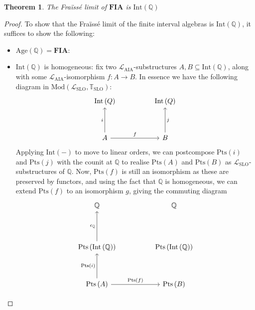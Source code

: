 \documentclass[11pt %
              ]{article}
\newcommand{\Q}{\mathbb{Q}}
\newcommand{\counit}[1]{\epsilon_{#1}}
\newcommand{\lang}{\mathcal{L}}
\newcommand{\theory}{\mathbb{T}}
\newcommand{\age}[1]{\text{Age}\left(#1\right)}
\newcommand{\finaia}{\textbf{FIA}}
\newcommand{\lslo}{\lang_\text{SLO}}
\newcommand{\tslo}{\theory_\text{SLO}}
\newcommand{\laia}{\lang_\text{AIA}}
\newcommand{\mods}[2]{\text{Mod}\left(#1,#2\right)}
\newcommand{\slos}{\mods{\lslo}{\tslo}}
\newcommand{\inter}[1][-]{\text{Int}\left(#1\right)}
\newcommand{\points}[1][-]{\text{Pts}\left(#1\right)}
\theoremstyle{plain}
\newtheorem{thm}{Theorem}%
\theoremstyle{definition}
\theoremstyle{remark}
\begin{document}
\begin{thm}
  The Fraïssé limit of $\finaia$ is $\inter[\Q]$
\end{thm}
\begin{proof}
  To show that the Fraïssé limit of the finite interval algebras is $\inter[\Q]$, it suffices to
  show the following:
  \begin{itemize}
    \item $\age{\Q} = \finaia$:
    \item $\inter[\Q]$ is homogeneous: fix two $\laia$-substructures $A,B \subseteq \inter[\Q]$,
      along with some $\laia$-isomorphism $f : A \to B$. In essence we have the following
      diagram in $\slos$:
      \[\begin{tikzcd}
        {\inter[Q]} && {\inter[Q]} \\
        \\
        A && B
        \arrow["f", from=3-1, to=3-3]
        \arrow["i", from=3-1, to=1-1]
        \arrow["j"', from=3-3, to=1-3]
      \end{tikzcd}\]
      Applying $\inter$ to move to linear orders, we can postcompose $\points[i]$ and $\points[j]$ with
      the counit at $\Q$ to realise $\points[A]$ and $\points[B]$ as $\lslo$-substructures of $\Q$.
      Now, $\points[f]$ is still an isomorphism as these are preserved by functors, and using the
      fact that $\Q$ is homogeneous, we can extend $\points[f]$ to an isomorphism $g$, giving the
      commuting diagram
      \[\begin{tikzcd}
        \Q && \Q \\
        {} \\
        {\points[\inter[\Q]]} && {\points[\inter[\Q]]} \\
        \\
        {\points[A]} && {\points[B]}
        \arrow["{\points[f]}", from=5-1, to=5-3]
        \arrow["{\points[i]}", from=5-1, to=3-1]
        \arrow["{\counit{\Q}}", from=3-1, to=1-1]

\end{tikzcd}\]
\end{itemize}
\end{proof}
\end{document}

